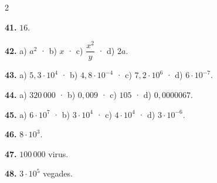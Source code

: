 \documentclass[13pt,a4paper]{extarticle}
\begin{document}
\begin{multicols}{2}
\begin{minipage}{\linewidth}
\end{minipage}\par\vspace{1.6mm}
\par\noindent\begin{minipage}{\linewidth}
\textbf{41.} $16$.\par
\end{minipage}\par\vspace{1.6mm}
\par\noindent\begin{minipage}{\linewidth}
\textbf{42.} a) $a^2$ · b) $x$ · c) $\dfrac{x^2}{y}$ · d) $2a$.\par
\end{minipage}\par\vspace{1.6mm}
\par\noindent\begin{minipage}{\linewidth}
\textbf{43.} a) $5{,}3\cdot10^4$ · b) $4{,}8\cdot10^{-4}$ · c) $7{,}2\cdot10^6$ · d) $6\cdot10^{-7}$.\par
\end{minipage}\par\vspace{1.6mm}
\par\noindent\begin{minipage}{\linewidth}
\textbf{44.} a) $320\,000$ · b) $0{,}009$ · c) $105$ · d) $0{,}0000067$.\par
\end{minipage}\par\vspace{1.6mm}
\par\noindent\begin{minipage}{\linewidth}
\textbf{45.} a) $6\cdot10^7$ · b) $3\cdot10^4$ · c) $4\cdot10^4$ · d) $3\cdot10^{-6}$.\par
\end{minipage}\par\vspace{1.6mm}
\par\noindent\begin{minipage}{\linewidth}
\textbf{46.} $8\cdot10^3$.\par
\end{minipage}\par\vspace{1.6mm}
\par\noindent\begin{minipage}{\linewidth}
\textbf{47.} $100\,000$ virus.\par
\end{minipage}\par\vspace{1.6mm}
\par\noindent\begin{minipage}{\linewidth}
\textbf{48.} $3\cdot10^5$ vegades.\par


\end{minipage}
\end{multicols}
\end{document}
